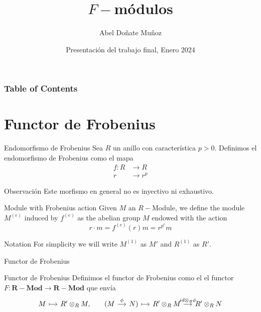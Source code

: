 \documentclass{beamer}
\title[F-módulos] %
{$F-$módulos}
\author[Abel Doñate] %
{Abel Doñate Muñoz}
\institute[UPC] %
{
  Universitat Politècica de Catalunya
}
\date[Enero 2024] %
{Presentación del trabajo final, Enero 2024}
\newcommand{\catname}[1]{{\mathbf{#1}}}
\newcommand{\Mod}{\catname{R-Mod}}
\begin{document}
\frame{\titlepage}


\begin{frame}
\frametitle{Table of Contents}
\tableofcontents
\end{frame}


\section{Functor de Frobenius}

\begin{frame}{}
\begin{block}{Endomorfismo de Frobenius}
Sea $R$ un anillo con característica $p>0$. Definimos el endomorfismo de Frobenius como el mapa
\begin{align*}
f: R &\to R \\
r &\to r^p
\end{align*}
\end{block}    

\begin{block}{Observación}
    Este morfismo en general no es inyectivo ni exhaustivo.
\end{block}
\end{frame}

\begin{frame}{}
\begin{block}{Module with Frobenius action} Given $M$ an  $R-$Module, we define the module  $M^{(e)}$ induced by  $f^{(e)}$ as the abelian group $M$ endowed with the action
  \[
  r \cdot  m  = f ^{(e)}(r)m = r ^{p^e} m
  \] 
\end{block}
\begin{block}{Notation} For simplicity we will write $M^{(1)}$ as  $M'$ and $R^{(1)}$ as  $R'$.
\end{block}

\end{frame}

\begin{frame}[fragile]{Functor de Frobenius}
\begin{block}{Functor de Frobenius}
  Definimos el functor de Frobenius como el el functor $F:\Mod \to \Mod$ que envía
  \[\begin{tikzcd}[column sep=small]
	M & {R'\otimes_RM,} & {(M} & {N)} & {R'\otimes_R M} & {R'\otimes_RN}
	\arrow["\phi", from=1-3, to=1-4]
	\arrow["{id\otimes_R\phi}", from=1-5, to=1-6]
	\arrow[maps to, from=1-4, to=1-5]
	\arrow[maps to, from=1-1, to=1-2]
\end{tikzcd}\]
\end{block}
\end{frame}
\end{document}

